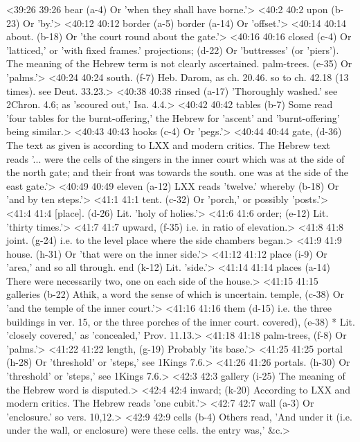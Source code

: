 <39:26 39:26  bear (a-4)  Or 'when they shall have borne.'>
<40:2 40:2  upon (b-23)  Or 'by.'>
<40:12 40:12  border (a-5)  border (a-14)
  Or 'offset.'>
<40:14 40:14  about. (b-18)  Or 'the court round about the gate.'>
<40:16 40:16  closed (c-4)  Or 'latticed,' or 'with fixed frames.'
  projections; (d-22)  Or 'buttresses' (or 'piers'). The meaning of the Hebrew term  is not clearly ascertained.
  palm-trees. (e-35)  Or 'palms.'>
<40:24 40:24  south. (f-7)  Heb. Darom, as ch. 20.46. so to ch. 42.18 (13 times). see  Deut. 33.23.>
<40:38 40:38  rinsed (a-17)  'Thoroughly washed.' see 2Chron. 4.6; as 'scoured out,' Isa. 4.4.>
<40:42 40:42  tables (b-7)  Some read 'four tables for the burnt-offering,' the Hebrew  for 'ascent' and 'burnt-offering' being similar.>
<40:43 40:43  hooks (c-4)  Or 'pegs.'>
<40:44 40:44  gate, (d-36)  The text as given is according to LXX and modern critics. The  Hebrew text reads '... were the cells of the singers in the  inner court which was at the side of the north gate; and their  front was towards the south. one was at the side of the east  gate.'>
<40:49 40:49  eleven (a-12)  LXX reads 'twelve.'
  whereby (b-18)  Or 'and by ten steps.'>
<41:1 41:1  tent. (c-32)  Or 'porch,' or possibly 'posts.'>
<41:4 41:4  [place]. (d-26)  Lit. 'holy of holies.'>
<41:6 41:6  order; (e-12)  Lit. 'thirty times.'>
<41:7 41:7  upward, (f-35)  i.e. in ratio of elevation.>
<41:8 41:8  joint. (g-24)  i.e. to the level place where the side chambers began.>
<41:9 41:9  house. (h-31)  Or 'that were on the inner side.'>
<41:12 41:12  place (i-9)  Or 'area,' and so all through.
  end (k-12)  Lit. 'side.'>
<41:14 41:14  places (a-14)  There were necessarily two, one on each side of the house.>
<41:15 41:15  galleries (b-22)  Athik, a word the sense of which is uncertain.
  temple, (c-38)  Or 'and the temple of the inner court.'>
<41:16 41:16  them (d-15)  i.e. the three buildings in ver. 15, or the three porches of  the inner court.
  covered), (e-38)  * Lit. 'closely covered,' as 'concealed,' Prov. 11.13.>
<41:18 41:18  palm-trees, (f-8)  Or 'palms.'>
<41:22 41:22  length, (g-19)  Probably 'its base.'>
<41:25 41:25  portal (h-28) Or 'threshold' or 'steps,' see 1Kings 7.6.>
<41:26 41:26  portals. (h-30)  Or 'threshold' or 'steps,' see 1Kings 7.6.>
<42:3 42:3  gallery (i-25)  The meaning of the Hebrew word is disputed.>
<42:4 42:4  inward; (k-20)  According to LXX and modern critics. The Hebrew reads 'one  cubit.'>
<42:7 42:7  wall (a-3)  Or 'enclosure.' so vers. 10,12.>
<42:9 42:9  cells (b-4)  Others read, 'And under it (i.e. under the wall, or  enclosure) were these cells. the entry was,' &c.>
